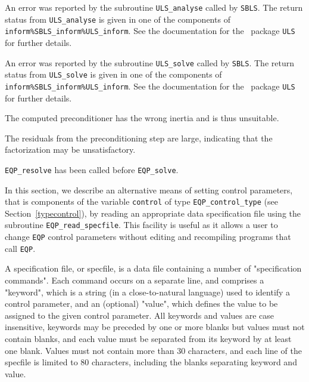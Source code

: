\documentclass{galahad}
\newcommand{\packagename}{EQP}
\begin{document}
\begin{description}
 An error was reported by the subroutine 
{\tt ULS\_analyse} called by {\tt SBLS}. 
The return status from {\tt ULS\_analyse} is given in one of the
components of {\tt inform\%SBLS\_inform\%ULS\_inform}.
See the documentation for the \galahad\ package {\tt ULS} for further details.

 An error was reported by the subroutine 
{\tt ULS\_solve} called by {\tt SBLS}. 
The return status from {\tt ULS\_solve} is given in one of the
components of {\tt inform\%SBLS\_inform\%ULS\_inform}.
See the documentation for the \galahad\ package {\tt ULS} for further details.

 The computed preconditioner has the 
wrong inertia and is thus unsuitable.

 The residuals from the preconditioning step 
are large, indicating that the factorization may be unsatisfactory.

 {\tt \packagename\_resolve} has been called
before {\tt \packagename\_solve}.

\end{description}


\galfeatures
\noindent In this section, we describe an alternative means of setting 
control parameters, that is components of the variable {\tt control} of type
{\tt \packagename\_control\_type}
(see Section~\ref{typecontrol}), 
by reading an appropriate data specification file using the
subroutine {\tt \packagename\_read\_specfile}. This facility
is useful as it allows a user to change  {\tt \packagename} control parameters 
without editing and recompiling programs that call {\tt \packagename}.

A specification file, or specfile, is a data file containing a number of 
"specification commands". Each command occurs on a separate line, 
and comprises a "keyword", 
which is a string (in a close-to-natural language) used to identify a 
control parameter, and 
an (optional) "value", which defines the value to be assigned to the given
control parameter. All keywords and values are case insensitive, 
keywords may be preceded by one or more blanks but
values must not contain blanks, and
each value must be separated from its keyword by at least one blank.
Values must not contain more than 30 characters, and 
each line of the specfile is limited to 80 characters,
including the blanks separating keyword and value.
\end{document}
